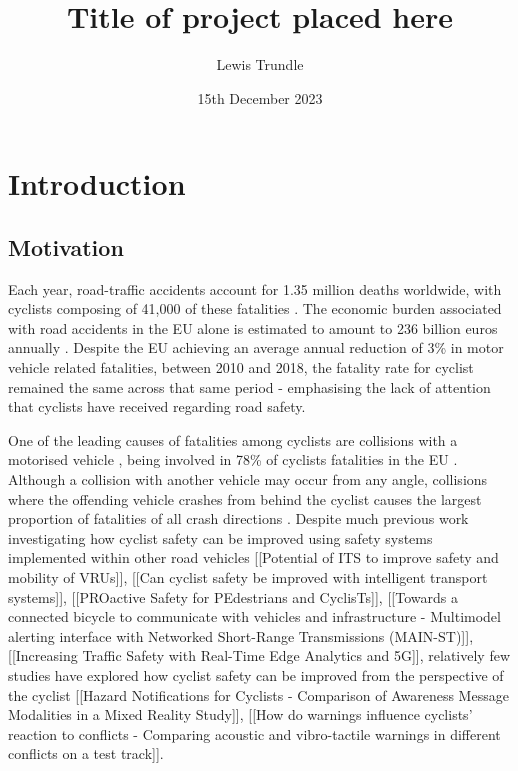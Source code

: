 \documentclass{interim}
\begin{document}
\title{Title of project placed here}
\author{Lewis Trundle}
\date{15th December 2023}
\maketitle

\tableofcontents
\newpage

\section{Introduction}\label{intro}

\subsection{Motivation}
Each year, road-traffic accidents account for 1.35 million deaths worldwide, with cyclists composing of 41,000 of these fatalities \cite{world2018global}. The economic burden associated with road accidents in the EU alone is estimated to amount to 236 billion euros annually \cite{costoftransport}. Despite the EU achieving an average annual reduction of 3\% in motor vehicle related fatalities, between 2010 and 2018, the fatality rate for cyclist remained the same across that same period \cite{adminaite2020safe} - emphasising the lack of attention that cyclists have received regarding road safety.

One of the leading causes of fatalities among cyclists are collisions with a motorised vehicle \cite{BIL20101632}, being involved in 78\% of cyclists fatalities in the EU \cite{adminaite2015making}. Although a collision with another vehicle may occur from any angle, collisions where the offending vehicle crashes from behind the cyclist causes the largest proportion of fatalities of all crash directions \cite{BIL20101632}. Despite much previous work investigating how cyclist safety can be improved using safety systems implemented within other road vehicles [[Potential of ITS to improve safety and mobility of VRUs]], [[Can cyclist safety be improved with intelligent transport systems]], [[PROactive Safety for PEdestrians and CyclisTs]], [[Towards a connected bicycle to communicate with vehicles and infrastructure - Multimodel alerting interface with Networked Short-Range Transmissions (MAIN-ST)]], [[Increasing Traffic Safety with Real-Time Edge Analytics and 5G]], relatively few studies have explored how cyclist safety can be improved from the perspective of the cyclist [[Hazard Notifications for Cyclists - Comparison of Awareness Message Modalities in a Mixed Reality Study]], [[How do warnings influence cyclists' reaction to conflicts - Comparing acoustic and vibro-tactile warnings in different conflicts on a test track]]. 
\end{document}
